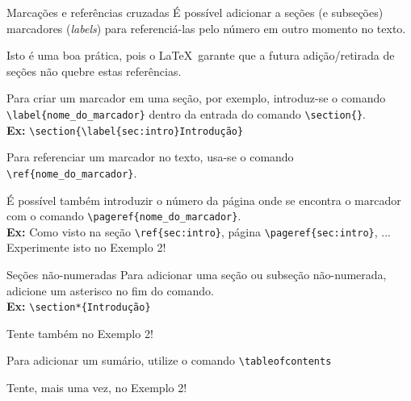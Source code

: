 \documentclass[12pt]{beamer}
\begin{document}
\begin{frame}{Marcações e referências cruzadas}
  É possível adicionar a seções (e subseções) marcadores (\textit{labels}) para referenciá-las pelo número em outro momento no texto.
  
  Isto é uma boa prática, pois o \LaTeX\ garante que a futura adição/retirada de seções não quebre estas referências.

\end{frame}

\begin{frame}[fragile]
  Para criar um marcador em uma seção, por exemplo, introduz-se o comando \verb+\label{nome_do_marcador}+ dentro da entrada do comando \verb+\section{}+.\\
  \bigskip  
  \textbf{Ex:} \verb+\section{\label{sec:intro}Introdução}+
\end{frame}

\begin{frame}[fragile]
  Para referenciar um marcador no texto, usa-se o comando \verb+\ref{nome_do_marcador}+. 
  
  É possível também introduzir o número da página onde se encontra o marcador com o comando \verb+\pageref{nome_do_marcador}+.\\
  \medskip
  \textbf{Ex:} Como visto na seção \verb+\ref{sec:intro}+, página \verb+\pageref{sec:intro}+, ...\\
  \medskip
  Experimente isto no Exemplo 2!
\end{frame}

\begin{frame}[fragile]{Seções não-numeradas}
  Para adicionar uma seção ou subseção não-numerada, adicione um asterisco no fim do comando.\\
  \medskip
  \textbf{Ex:} \verb+\section*{Introdução}+
  \medskip

  Tente também no Exemplo 2!
  
\end{frame}

\begin{frame}[fragile]
  Para adicionar um sumário, utilize o comando \verb+\tableofcontents+
  \bigskip

  Tente, mais uma vez, no Exemplo 2!
\end{frame}
\end{document}
